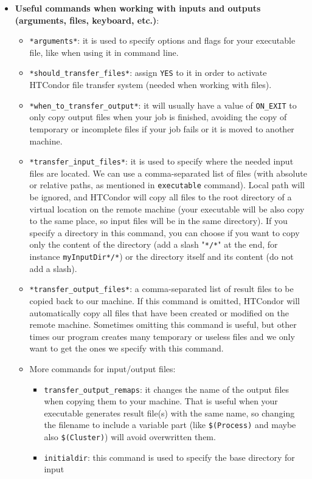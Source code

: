 \documentclass[a4paper,10pt]{article}
\begin{document}
\begin{itemize}
\item \textbf{Useful commands when working with inputs and outputs (arguments, files,
keyboard, etc.)}:
\begin{itemize}
\item \texttt{*arguments*}: it is used to specify options and flags for your executable
file, like when using it in command line.
\item \texttt{*should\_transfer\_files*}: assign \texttt{YES} to it in order to activate HTCondor
file transfer system (needed when working with files).
\item \texttt{*when\_to\_transfer\_output*}: it will usually have a value of \texttt{ON\_EXIT} to
only copy output files when your job is finished, avoiding the copy of
temporary or incomplete files if your job fails or it is moved to another
machine.
\item \texttt{*transfer\_input\_files*}: it is used to specify where the needed input files
are located. We can use a comma-separated list of files (with absolute or
relative paths, as mentioned in \texttt{executable} command). Local path will be
ignored, and HTCondor will copy all files to the root directory of a virtual
location on the remote machine (your executable will be also copy to the
same place, so input files will be in the same directory). If you specify a
directory in this command, you can choose if you want to copy only the
content of the directory (add a slash "\texttt{*/*}" at the end, for instance
\texttt{myInputDir*/*}) or the directory itself and its content (do not add a
slash).
\item \texttt{*transfer\_output\_files*}: a comma-separated list of result files to be
copied back to our machine. If this command is omitted, HTCondor will
automatically copy all files that have been created or modified on the
remote machine. Sometimes omitting this command is useful, but other times
our program creates many temporary or useless files and we only want to get
the ones we specify with this command.
\item More commands for input/output files:
\begin{itemize}
\item \texttt{transfer\_output\_remaps}: it changes the name of the output files when
copying them to your machine. That is useful when your executable
generates result file(s) with the same name, so changing the filename to
include a variable part (like \texttt{\$(Process)} and maybe also \texttt{\$(Cluster)})
will avoid overwritten them.
\item \texttt{initialdir}: this command is used to specify the base directory for input

\end{itemize}
\end{itemize}
\end{itemize}
\end{document}
